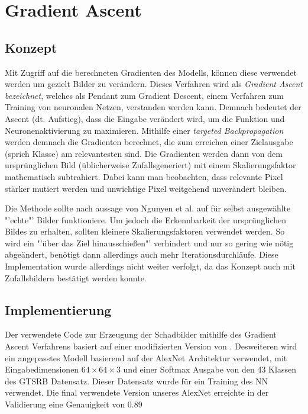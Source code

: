 \chapter{Gradient Ascent}
\label{cha:gascent}
\section{Konzept}

Mit Zugriff auf die berechneten Gradienten des Modells, können diese verwendet werden um gezielt Bilder zu verändern. Dieses Verfahren wird als \textit{Gradient Ascent bezeichnet}, welches als Pendant zum Gradient Descent, einem Verfahren zum Training von neuronalen Netzen, verstanden werden kann. Demnach bedeutet der Ascent (dt. Aufstieg), dass die Eingabe verändert wird, um die Funktion und Neuronenaktivierung zu maximieren. Mithilfe einer \textit{targeted Backpropagation} werden demnach die Gradienten berechnet, die zum erreichen einer Zielausgabe (sprich Klasse) am relevantesten sind. Die Gradienten werden dann von dem ursprünglichen Bild (üblicherweise Zufallsgeneriert) mit einem Skalierungsfaktor mathematisch subtrahiert. Dabei kann man beobachten, dass relevante Pixel stärker mutiert werden und unwichtige Pixel weitgehend unverändert bleiben.

Die Methode sollte nach aussage von Ngunyen et al. \cite{nguyen_deep_2015} auf für selbst ausgewählte "'echte"' Bilder funktioniere. Um jedoch die Erkennbarkeit der ursprünglichen Bildes zu erhalten, sollten kleinere Skalierungsfaktoren verwendet werden. So wird ein "'über das Ziel hinausschießen"' verhindert und nur so gering wie nötig abgeändert, benötigt dann allerdings auch mehr Iterationsdurchläufe.
Diese Implementation wurde allerdings nicht weiter verfolgt, da das Konzept auch mit Zufallsbildern bestätigt werden konnte.

\section{Implementierung}
Der verwendete Code zur Erzeugung der Schadbilder mithilfe des Gradient Ascent Verfahrens basiert auf einer modifizierten Version von \cite{ozbulak_pytorch_2019}. Desweiteren wird ein angepasstes Modell basierend auf der AlexNet Architektur verwendet, mit Eingabedimensionen $64\times64\times3$ und einer Softmax Ausgabe von den 43 Klassen des \ac{GTSRB} Datensatz. 
Dieser Datensatz wurde für ein Training des \ac{NN} verwendet. 
Die final verwendete Version unseres AlexNet erreichte in der Validierung eine Genauigkeit von 0.89


